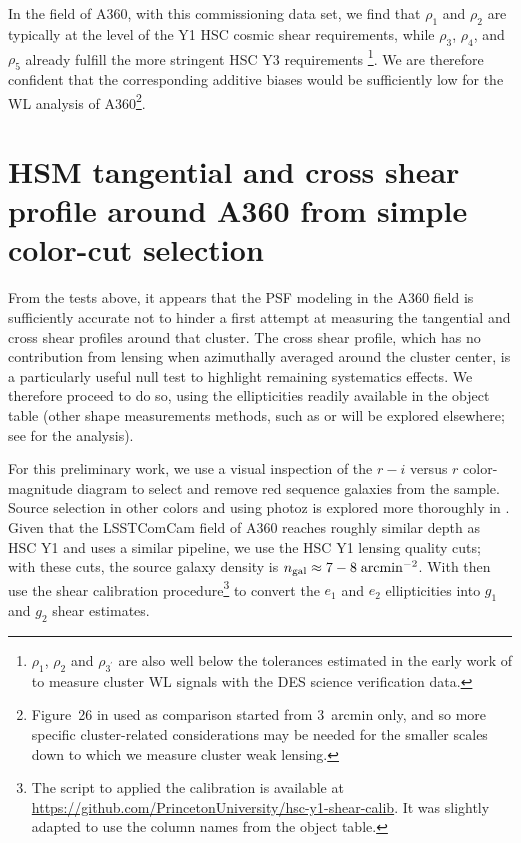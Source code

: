 \documentclass[SE,lsstdraft,authoryear,toc]{lsstdoc}
\begin{document}
In the field of A360, with this commissioning data set, we find that $\rho_1$ and $\rho_2$ are typically at the level of the Y1 HSC cosmic shear requirements, while $\rho_3$, $\rho_4$, and $\rho_5$ already fulfill the more stringent HSC Y3 requirements \footnote{$\rho_1$, $\rho_2$ and $\rho_{3^\prime}$ are also well below the tolerances estimated in the early work of \citet{2015MNRAS.449.2219M} to measure cluster WL signals with the DES science verification data.}. We are therefore confident that the corresponding additive biases would be sufficiently low for the WL analysis of A360\footnote{Figure~26 in \citet{2022PASJ...74..421L} used as comparison started from 3~arcmin only, and so more specific cluster-related considerations may be needed for the smaller scales down to which we measure cluster weak lensing.}.




\section{HSM tangential and cross shear profile around A360 from simple color-cut selection}
\label{sec:shear_profile}

From the tests above, it appears that the PSF modeling in the A360 field is sufficiently accurate not to hinder a first attempt at measuring the tangential and cross shear profiles around that cluster. The cross shear profile, which has no contribution from lensing when azimuthally averaged around the cluster center, is a particularly useful null test to highlight remaining systematics effects. We therefore proceed to do so, using the  ellipticities readily available in the object table (other shape measurements methods, such as  or  will be explored elsewhere; see  for the  analysis). 

For this preliminary work, we use a visual inspection of the $r-i$ versus $r$ color-magnitude diagram to select and remove red sequence galaxies from the sample. Source selection in other colors and using photoz is explored more thoroughly in . 
Given that the LSSTComCam field of A360 reaches roughly similar depth as HSC Y1 and uses a similar pipeline, we use the HSC Y1 lensing quality cuts; with these cuts, the source galaxy density is $n_{\rm gal}\approx 7-8\;{\rm arcmin}^{-2}$.  With then use the shear calibration procedure\footnote{The script to applied the calibration is available at \url{https://github.com/PrincetonUniversity/hsc-y1-shear-calib}. It was slightly adapted to use the column names from the object table.} \citep{2018MNRAS.481.3170M} to convert the $e_1$ and $e_2$ ellipticities into $g_1$ and $g_2$ shear estimates. 
\end{document}
